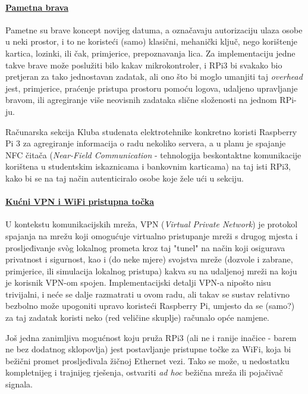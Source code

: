 \documentclass[12pt,a4paper]{article}
\begin{document}
	\paragraph{\underline{Pametna brava}} %
	\label{par:smart_lock}
		Pametne su brave koncept novijeg datuma, a označavaju autorizaciju ulaza osobe u neki prostor, i to ne koristeći (samo) klasični, mehanički ključ, nego korištenje kartica, lozinki, ili čak, primjerice, prepoznavanja lica. Za implementaciju jedne takve brave može poslužiti bilo kakav mikrokontroler, i RPi3 bi svakako bio pretjeran za tako jednostavan zadatak, ali ono što bi moglo umanjiti taj \textit{overhead} jest, primjerice, praćenje pristupa prostoru pomoću logova, udaljeno upravljanje bravom, ili agregiranje više neovisnih zadataka slične složenosti na jednom RPi-ju.
		\par Računarska sekcija Kluba studenata elektrotehnike konkretno koristi Raspberry Pi 3 za agregiranje informacija o radu nekoliko servera, a u planu je spajanje NFC čitača (\textit{Near-Field Communication} - tehnologija beskontaktne komunikacije korištena u studentskim iskaznicama i bankovnim karticama) na taj isti RPi3, kako bi se na taj način autenticiralo osobe koje žele ući u sekciju.


	\paragraph{\underline{Kućni VPN i WiFi pristupna točka}} %
	\label{par:home_vpn}
		U kontekstu komunikacijskih mreža, VPN (\textit{Virtual Private Network}) je protokol spajanja na mrežu koji omogućuje virtualno pristupanje mreži s drugog mjesta i prosljeđivanje svòg lokalnog prometa kroz taj "tunel" na način koji osigurava privatnost i sigurnost, kao i (do neke mjere) svojstva mreže (dozvole i zabrane, primjerice, ili simulacija lokalnog pristupa) kakva su na udaljenoj mreži na koju je korisnik VPN-om spojen. Implementacijski detalji VPN-a nipošto nisu trivijalni, i neće se dalje razmatrati u ovom radu, ali takav se sustav relativno bezbolno može upogoniti upravo koristeći Raspberry Pi, umjesto da se (samo?) za taj zadatak koristi neko (red veličine skuplje) računalo opće namjene.
		\par Još jedna zanimljiva mogućnost koju pruža RPi3 (ali ne i ranije inačice - barem ne bez dodatnog sklopovlja) jest postavljanje pristupne točke za WiFi, koja bi bežični promet prosljeđivala žičnoj Ethernet vezi. Tako se može, u nedostatku kompletnijeg i trajnijeg rješenja, ostvariti \textit{ad hoc} bežična mreža ili pojačivač signala.
\end{document}
